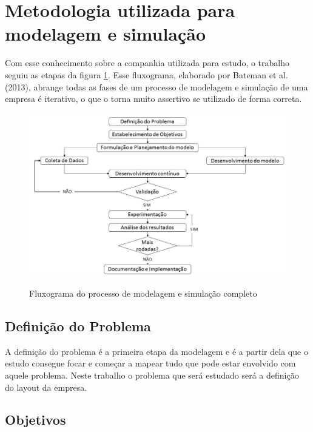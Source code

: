 \documentclass[
	12pt,				%
	openright,			%
	oneside,			%
	a4paper,			%
	english,			%
	french,				%
	spanish,			%
	brazil				%
	]{abntex2}
\begin{document}
\section{Metodologia utilizada para modelagem e simulação}

Com esse conhecimento sobre a companhia utilizada para estudo, o trabalho seguiu as etapas da figura \ref{fluxo}. Esse fluxograma, elaborado por Bateman et al. (2013), abrange todas as fases de um processo de modelagem e simulação de uma empresa é iterativo, o que o torna muito assertivo se utilizado de forma correta.

\begin{figure}[H]
\begin{center}
\caption{Fluxograma do processo de modelagem e simulação completo}
\includegraphics[scale=0.45]{../../Pictures/bateman.png} 
\label{fluxo}
\end{center}
\end{figure}

\subsection{Definição do Problema}
	
A definição do problema é a primeira etapa da modelagem e é a partir dela que o estudo consegue focar e começar a mapear tudo que pode estar envolvido com aquele problema. Neste trabalho o problema que será estudado será a definição do layout da empresa.

\subsection{Objetivos}
		
\end{document}
